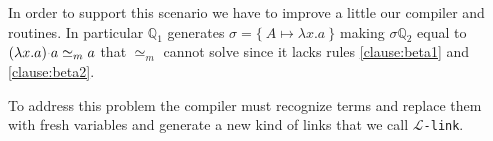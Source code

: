 \documentclass[sigconf,natbib=false,review]{acmart}
\newcommand{\appsep}{\ensuremath{\textcolor{lightgray}{\cdot}}}
\newcommand{\UnifRel}{\ensuremath{\simeq}}
\newcommand{\nUnifRel}{\ensuremath{\not\simeq}}
\newcommand{\Uo}{\texorpdfstring{\ensuremath{\UnifRel_o}\xspace}{unif\_o}}
\newcommand{\nUo}{\ensuremath{\nUnifRel_o}\xspace}
\newcommand{\Ue}{\ensuremath{\UnifRel_m}\xspace}
\newcommand{\llambda}{\ensuremath{\mathcal{L}}\xspace}
\newcommand{\linkMacro}[1]{\ensuremath{#1}\texttt{-link}\xspace}
\newcommand{\linkbeta}{\linkMacro{\llambda}}
\newcommand{\foUnifPb}{\ensuremath{\mathbb{P}}\xspace}
\newcommand{\hoUnifPb}{\ensuremath{\mathbb{Q}}\xspace}
\begin{document}




\noindent
In order to support this scenario we have to improve a little our compiler
and \progress routines.
In particular $\hoUnifPb_1$ generates $\sigma = \{~ A
\mapsto \lambda x. a ~\}$ making $\sigma\hoUnifPb_2$ equal to
$(\lambda x. a) \appsep a \Ue a$ that \Ue{} cannot solve since it
lacks rules \ref{clause:beta1} and \ref{clause:beta2}.

To address this problem the compiler must recognize
\notllambda terms
and replace them
with fresh variables and generate a new kind of links
that we call \linkbeta.
\end{document}
